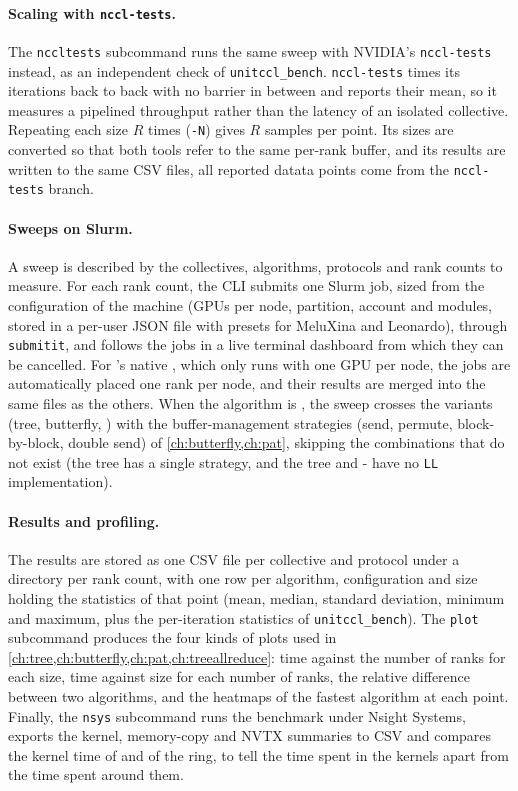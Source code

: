 \paragraph{Scaling with \texttt{nccl-tests}.}
The \texttt{nccltests} subcommand runs the same sweep with NVIDIA's \texttt{nccl-tests} instead, as an independent check of \texttt{unitccl\_bench}.
\texttt{nccl-tests} times its iterations back to back with no barrier in between and reports their mean, so it measures a pipelined throughput rather than the latency of an isolated collective. Repeating each size $R$ times (\texttt{-N}) gives $R$ samples per point.
Its sizes are converted so that both tools refer to the same per-rank buffer, and its results are written to the same CSV files, all reported datata points come from the \texttt{nccl-tests} branch.

\paragraph{Sweeps on Slurm.}
A sweep is described by the collectives, algorithms, protocols and rank counts to measure.
For each rank count, the CLI submits one Slurm job, sized from the configuration of the machine (GPUs per node, partition, account and modules, stored in a per-user JSON file with presets for MeluXina and Leonardo), through \texttt{submitit}, and follows the jobs in a live terminal dashboard from which they can be cancelled.
For \nccl{}'s native \pat{}, which only runs with one GPU per node, the jobs are automatically placed one rank per node, and their results are merged into the same files as the others.
When the algorithm is \bine{}, the sweep crosses the variants (tree, butterfly, \pat{}) with the buffer-management strategies (send, permute, block-by-block, double send) of \cref{ch:butterfly,ch:pat}, skipping the combinations that do not exist (the tree has a single strategy, and the tree and \bine{}-\pat{} have no \texttt{LL} implementation).

\paragraph{Results and profiling.}
The results are stored as one CSV file per collective and protocol under a directory per rank count, with one row per algorithm, configuration and size holding the statistics of that point (mean, median, standard deviation, minimum and maximum, plus the per-iteration statistics of \texttt{unitccl\_bench}).
The \texttt{plot} subcommand produces the four kinds of plots used in \cref{ch:tree,ch:butterfly,ch:pat,ch:treeallreduce}: time against the number of ranks for each size, time against size for each number of ranks, the relative difference between two algorithms, and the heatmaps of the fastest algorithm at each point.
Finally, the \texttt{nsys} subcommand runs the benchmark under Nsight Systems, exports the kernel, memory-copy and NVTX summaries to CSV and compares the kernel time of \bine{} and of the ring, to tell the time spent in the kernels apart from the time spent around them.
